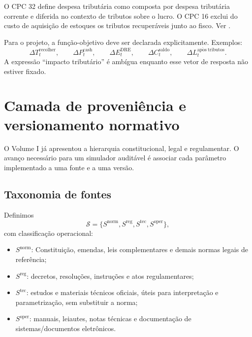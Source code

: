 \documentclass[11pt,a4paper]{article}
\newcommand{\cS}{\mathcal{S}}
\begin{document}
\begin{fonte}
O CPC 32 define despesa tributária como composta por despesa tributária corrente e diferida no contexto de tributos sobre o lucro. O CPC 16 exclui do custo de aquisição de estoques os tributos recuperáveis junto ao fisco. Ver \cite{CPC32,CPC16}.
\end{fonte}

\begin{formalizacao}
Para o projeto, a função-objetivo deve ser declarada explicitamente. Exemplos:
\[
\Delta T_t^{\mathrm{recolher}},\qquad
\Delta P_t^{\mathrm{cash}},\qquad
\Delta E_t^{\mathrm{DRE}},\qquad
\Delta C_t^{\mathrm{saldo}},\qquad
\Delta L_t^{\mathrm{ap\acute{o}s\ tributos}}.
\]
A expressão ``impacto tributário'' é ambígua enquanto esse vetor de resposta não estiver fixado.
\end{formalizacao}

\section{Camada de proveniência e versionamento normativo}

O Volume I já apresentou a hierarquia constitucional, legal e regulamentar. O avanço necessário para um simulador auditável é associar cada parâmetro implementado a uma fonte e a uma versão.

\subsection{Taxonomia de fontes}

Definimos
\begin{equation}
\boxed{
\cS=
\{S^{\mathrm{norm}},S^{\mathrm{reg}},S^{\mathrm{tec}},S^{\mathrm{oper}}\},
}
\label{eq:sources}
\end{equation}
com classificação operacional:
\begin{itemize}
  \item $S^{\mathrm{norm}}$: Constituição, emendas, leis complementares e demais normas legais de referência;
  \item $S^{\mathrm{reg}}$: decretos, resoluções, instruções e atos regulamentares;
  \item $S^{\mathrm{tec}}$: estudos e materiais técnicos oficiais, úteis para interpretação e parametrização, sem substituir a norma;
  \item $S^{\mathrm{oper}}$: manuais, leiautes, notas técnicas e documentação de sistemas/documentos eletrônicos.
\end{itemize}
\end{document}
